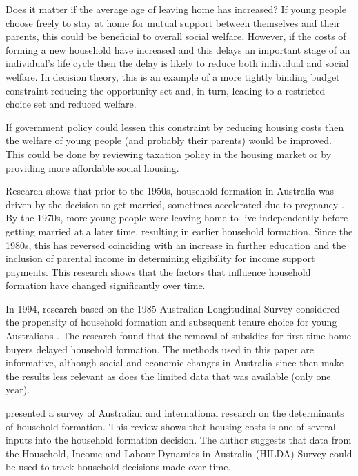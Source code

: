 \documentclass[12pt]{article}
\begin{document}
Does it matter if the average age of leaving home has increased?  If young people choose freely to stay at home for mutual support between themselves and their parents, this could be beneficial to overall social welfare. However, if the costs of forming a new household have increased and this delays an important stage of an individual's life cycle then the delay is likely to reduce both individual and social welfare. In decision theory, this is an example of a more tightly binding budget constraint reducing the opportunity set and, in turn, leading to a restricted choice set and reduced welfare.

If government policy could lessen this constraint by reducing housing costs then the welfare of young people (and probably their parents) would be improved. This could be done by reviewing taxation policy in the housing market or by providing more affordable social housing.

Research shows that prior to the 1950s, household formation in Australia was driven by the decision to get married, sometimes accelerated due to pregnancy \parencite{weston2001australian}. By the 1970s, more young people were leaving home to live independently before getting married at a later time, resulting in earlier household formation. Since the 1980s, this has reversed coinciding with an increase in further education and the inclusion of parental income in determining eligibility for income support payments. This research shows that the factors that influence household formation have changed significantly over time.

In 1994, research based on the 1985 Australian Longitudinal Survey considered the propensity of household formation and subsequent tenure choice for young Australians  \parencite{bourassa1994independent}. The research found that the removal of subsidies for first time home buyers delayed household formation. The methods used in this paper are informative, although social and economic changes in Australia since then make the results less relevant as does the limited data that was available (only one year).

\cite{cobb2008leaving} presented a survey of Australian and international research on the determinants of household formation. This review shows that housing costs is one of several inputs into the household formation decision. The author suggests that data from the Household, Income and Labour Dynamics in Australia (HILDA) Survey could be used to track household decisions made over time.
\end{document}

